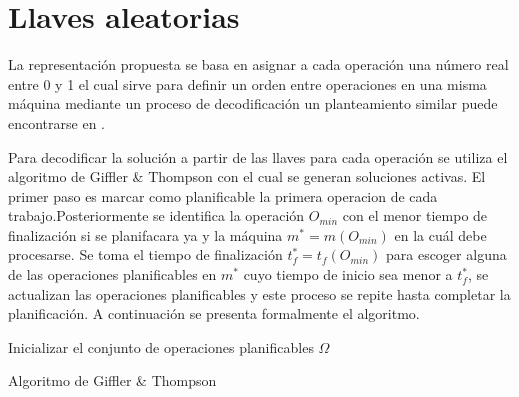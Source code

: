 \section{Llaves aleatorias}
La representación propuesta se basa en asignar a cada operación una número real entre 0 y 1 el cual sirve para definir un orden entre operaciones en una misma máquina mediante un proceso de decodificación un planteamiento similar puede encontrarse en \cite{norman1996random}.

Para decodificar la solución a partir de las llaves para cada operación se utiliza el algoritmo de Giffler \& Thompson \cite{Giffler1960} con el cual se generan soluciones activas. El primer paso es marcar como planificable la primera operacion de cada trabajo.Posteriormente se identifica la operación $O_{min}$ con el menor tiempo de finalización si se planifacara ya y la máquina $m^*=m(O_{min})$ en la cuál debe procesarse. Se toma el tiempo de finalización $t^*_f = t_f(O_{min})$ para escoger alguna de las operaciones planificables en $m^*$ cuyo tiempo de inicio sea menor a $t^*_f$, se actualizan las operaciones planificables y este proceso se repite hasta completar la planificación. A continuación se presenta formalmente el algoritmo.


\begin{algorithm}[H]
 Inicializar el conjunto de operaciones planificables $\Omega$\;
    \label{alg:GT}
    \caption{Algoritmo de Giffler \& Thompson}
\end{algorithm}


